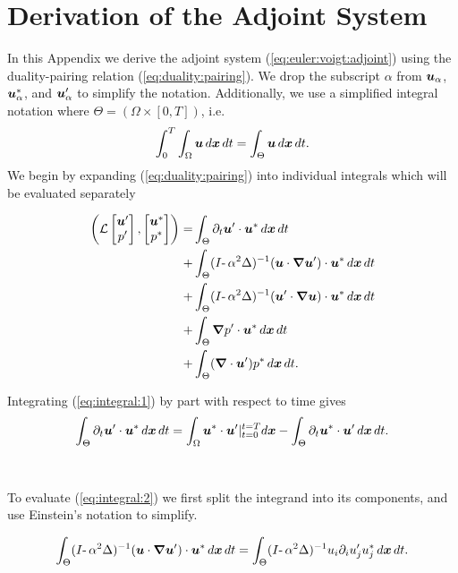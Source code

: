 \chapter{Derivation of the Adjoint System}
\label{app:adjoint}
\renewcommand{\arraystretch}{1.0}

In this Appendix we derive the adjoint system (\ref{eq:euler:voigt:adjoint}) using the duality-pairing relation (\ref{eq:duality:pairing}). We drop the subscript $\alpha$ from $\boldsymbol u_\alpha$, $\boldsymbol u^*_\alpha$, and $\boldsymbol u'_\alpha$ to simplify the notation. {\color{red} Additionally, we use a simplified integral notation where $\Theta = (\Omega \times [0,T])$, i.e.
$$\int_0^T\int_{\Omega} \boldsymbol u \,d\boldsymbol x\,dt = \int_\Theta \boldsymbol u \,d\boldsymbol x\,dt. $$
}We begin by expanding (\ref{eq:duality:pairing}) into individual integrals which will be evaluated separately

\begin{subequations}
\begin{align}
\left(\mathcal{L}\begin{bmatrix}
\boldsymbol u'\\
p'
\end{bmatrix}, \begin{bmatrix}
\boldsymbol u^*\\
p^*
\end{bmatrix} \right) =& \int_{\Theta} \partial_t \boldsymbol u' \cdot \boldsymbol u^* \,d\boldsymbol x\,dt \label{eq:integral:1} \\
+& \int_{\Theta} (I\text{-}\,\alpha^2\Delta)^{-1}(\boldsymbol u\cdot{\boldsymbol \nabla}\boldsymbol u')\cdot\boldsymbol u^* \,d\boldsymbol x\,dt \label{eq:integral:2} \\
+& \int_{\Theta} (I\text{-}\,\alpha^2\Delta)^{-1}(\boldsymbol u'\cdot{\boldsymbol \nabla}\boldsymbol u)\cdot\boldsymbol u^* \,d\boldsymbol x\,dt \label{eq:integral:3} \\
+& \int_{\Theta} {\boldsymbol \nabla} p' \cdot \boldsymbol u^* \,d\boldsymbol x\,dt \label{eq:integral:4} \\ 
+& \int_{\Theta} ({\boldsymbol \nabla} \cdot \boldsymbol u')p^* \,d\boldsymbol x\,dt. \label{eq:integral:5}
\end{align}
\end{subequations}

\noindent Integrating (\ref{eq:integral:1}) by part with respect to time gives
$$\int_{\Theta} \partial_t \boldsymbol u' \cdot \boldsymbol u^* \,d\boldsymbol x\, dt = \int_{\Omega}\boldsymbol u^*\cdot \boldsymbol u'|_{t=0}^{t=T} d\boldsymbol x - \int_{\Theta} \partial_t \boldsymbol u^* \cdot \boldsymbol u' \,d\boldsymbol x\,dt.$$
\\~\\
\noindent To evaluate (\ref{eq:integral:2}) we first split the integrand into its components, and use Einstein's notation to simplify.

$$\int_{\Theta}(I\text{-}\,\alpha^2\Delta)^{-1}(\boldsymbol u\cdot{\boldsymbol \nabla}\boldsymbol u')\cdot \boldsymbol u^* \,d\boldsymbol x\,dt = \int_{\Theta}(I\text{-}\,\alpha^2\Delta)^{-1}u_i\partial_i u'_j u_j^* \,d\boldsymbol x\,dt.$$

